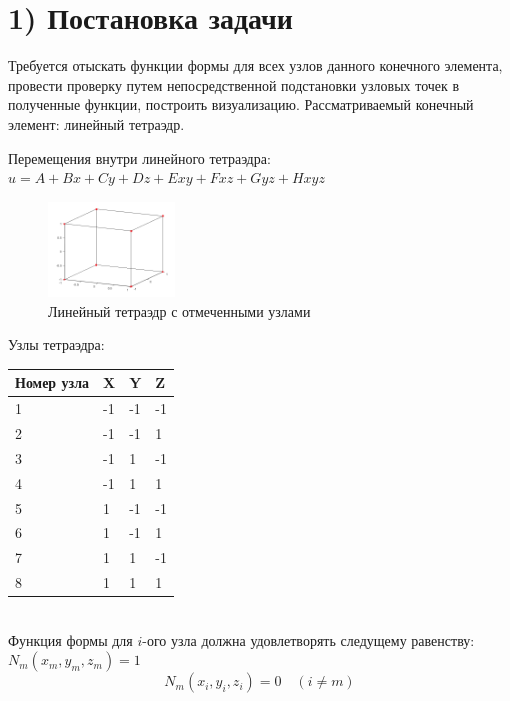 \documentclass[]{article}
\begin{document}
	\section*{1) Постановка задачи}
		Требуется отыскать функции формы для всех узлов данного конечного элемента, провести проверку путем непосредственной подстановки узловых точек в полученные функции, построить визуализацию. Рассматриваемый конечный элемент: линейный тетраэдр.\\
		\begin{center}
			Перемещения внутри линейного тетраэдра: $u=A+Bx+Cy+Dz+Exy+Fxz+Gyz+Hxyz$
			\begin{figure}[H]
				\centering
				\includegraphics[width=0.3\textwidth]{tetr}
				\caption{Линейный тетраэдр с отмеченными узлами}
				\label{рис. 1}
			\end{figure}
			Узлы тетраэдра:\\
			\begin{tabular}{| p{1cm} | p{1cm}| p{1cm} |p{1cm} |}
				\hline
				Номер узла & X & Y & Z\\
				\hline
				1 & -1 & -1 & -1\\
				\hline
				2 &	-1 & -1	& 1\\
				\hline
				3 & -1 &  1 & -1\\
				\hline
				4 & -1 &  1	& 1\\
				\hline
				5 &	  1 & -1	& -1\\
				\hline
				6 &   1 & -1 & 1\\
				\hline
				7 &	  1 &  1 & -1\\
				\hline
				8 &	  1 &  1	& 1\\
				\hline
			\end{tabular}\\[2\baselineskip]
			Функция формы для $i \text{-ого}$ узла должна удовлетворять следущему равенству:\\
			$N_m(x_m,y_m,z_m)=1$
			\[N_m(x_i,y_i,z_i)=0 \quad (i\neq m)\]
		\end{center}
\end{document}
